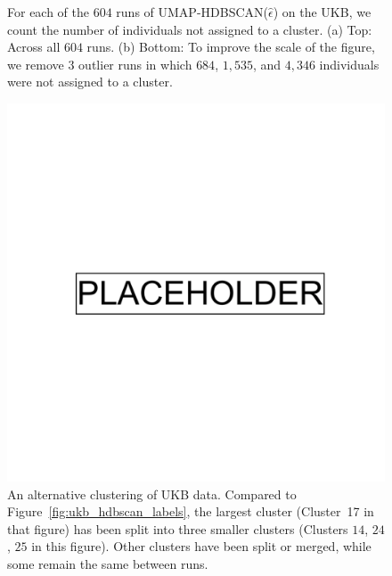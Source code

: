\begin{figure}[ht]
\begin{subfigure}[b]{0.4\linewidth}
    \caption{}
    \label{fig:supp_num_unclustered_2}
  \end{subfigure}
  \caption[Measuring the number of individuals not clustered]{For each of the $604$ runs of UMAP-HDBSCAN($\hat{\epsilon}$) on the UKB, we count the number of individuals not assigned to a cluster. (a) Top: Across all  $604$ runs. (b) Bottom: To improve the scale of the figure, we remove $3$ outlier runs in which $684$, $1,535$, and $4,346$ individuals were not assigned to a cluster.}
  \label{fig:supp_num_unclustered}
\end{figure}

\clearpage

\begin{figure}[!ht]
  \centering
\includegraphics[width=0.7\linewidth]{placeholder.png}
  \caption[Alternative clustering of the UKB]{An alternative clustering of UKB data. Compared to Figure~\ref{fig:ukb_hdbscan_labels}, the largest cluster (Cluster~17 in that figure) has been split into three smaller clusters (Clusters $14$, $24$, $25$ in this figure). Other clusters have been split or merged, while some remain the same between runs.}
  \label{fig:supp_ukb_alt}
\end{figure}

\clearpage

